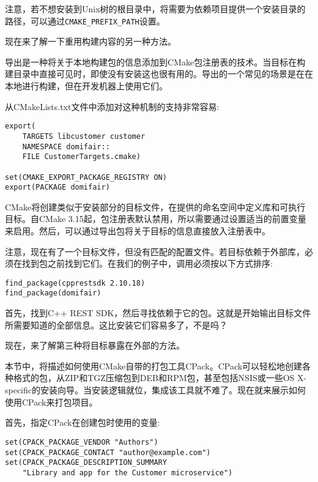 注意，若不想安装到Unix树的根目录中，将需要为依赖项目提供一个安装目录的路径，可以通过\texttt{CMAKE\_PREFIX\_PATH}设置。

现在来了解一下重用构建内容的另一种方法。


导出是一种将关于本地构建包的信息添加到CMake包注册表的技术。当目标在构建目录中直接可见时，即使没有安装这也很有用的。导出的一个常见的场景是在在本地进行构建，但在开发机器上使用它们。

从CMakeLists.txt文件中添加对这种机制的支持非常容易:

\begin{lstlisting}[style=styleCMake]
export(
	TARGETS libcustomer customer
	NAMESPACE domifair::
	FILE CustomerTargets.cmake)

set(CMAKE_EXPORT_PACKAGE_REGISTRY ON)
export(PACKAGE domifair)
\end{lstlisting}

CMake将创建类似于安装部分的目标文件，在提供的命名空间中定义库和可执行目标。自CMake 3.15起，包注册表默认禁用，所以需要通过设置适当的前置变量来启用。然后，可以通过导出包将关于目标的信息直接放入注册表中。

注意，现在有了一个目标文件，但没有匹配的配置文件。若目标依赖于外部库，必须在找到包之前找到它们。在我们的例子中，调用必须按以下方式排序:

\begin{lstlisting}[style=styleCMake]
find_package(cpprestsdk 2.10.18)
find_package(domifair)
\end{lstlisting}

首先，找到C++ REST SDK，然后寻找依赖于它的包。这就是开始输出目标文件所需要知道的全部信息。这比安装它们容易多了，不是吗？

现在，来了解第三种将目标暴露在外部的方法。


本节中，将描述如何使用CMake自带的打包工具CPack。CPack可以轻松地创建各种格式的包，从ZIP和TGZ压缩包到DEB和RPM包，甚至包括NSIS或一些OS X-specific的安装向导。当安装逻辑就位，集成该工具就不难了。现在就来展示如何使用CPack来打包项目。

首先，指定CPack在创建包时使用的变量:

\begin{lstlisting}[style=styleCMake]
set(CPACK_PACKAGE_VENDOR "Authors")
set(CPACK_PACKAGE_CONTACT "author@example.com")
set(CPACK_PACKAGE_DESCRIPTION_SUMMARY
	"Library and app for the Customer microservice")
\end{lstlisting}

